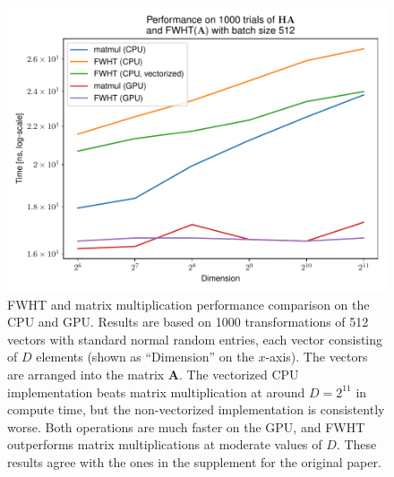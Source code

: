 \begin{figure}[htb]
    \centering
    \includegraphics[width=\hsize]{img/compute-performance-all}
    \caption{
        FWHT and matrix multiplication performance comparison on the CPU and GPU.
        Results are based on 1000 transformations of 512 vectors with standard normal random entries, each vector consisting of $D$ elements (shown as ``Dimension'' on the $x$-axis).
        The vectors are arranged into the matrix $\mathbf{A}$.
        The vectorized CPU implementation beats matrix multiplication at around $D = 2^{11}$ in compute time, but the non-vectorized implementation is consistently worse.
        Both operations are much faster on the GPU, and FWHT outperforms matrix multiplications at moderate values of $D$.
        These results agree with the ones in the supplement for the original paper.
    }
    \label{fig:compute-performance}
\end{figure}
